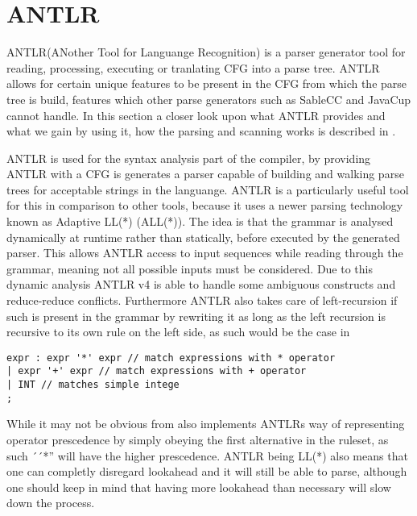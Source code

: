 \section{ANTLR}
ANTLR(ANother Tool for Languange Recognition) is a parser generator tool for reading, processing, executing or tranlating CFG into a parse tree.
ANTLR allows for certain unique features to be present in the CFG from which the parse tree is build, features which other parse generators such as SableCC and JavaCup cannot handle. 
In this section a closer look upon what ANTLR provides and what we gain by using it, how the parsing and scanning works is described in .

ANTLR is used for the syntax analysis part of the compiler, by providing ANTLR with a CFG is generates a parser capable of building and walking parse trees for acceptable strings in the languange.
ANTLR is a particularly useful tool for this in comparison to other tools, because it uses a newer parsing technology known as Adaptive LL(*) (ALL(*)).
The idea is that the grammar is analysed dynamically at runtime rather than statically, before executed by the generated parser.
This allows ANTLR access to input sequences while reading through the grammar, meaning not all possible inputs must be considered.
Due to this dynamic analysis ANTLR v4 is able to handle some ambiguous constructs and reduce-reduce conflicts.
Furthermore ANTLR also takes care of left-recursion if such is present in the grammar by rewriting it as long as the left recursion is recursive to its own rule on the left side, as such would be the case in 
\begin{lstlisting}[caption=An ambiguous rule for expr,frame=tlrb,label={lst:amb}]
expr : expr '*' expr // match expressions with * operator
| expr '+' expr // match expressions with + operator
| INT // matches simple intege
;
\end{lstlisting}
While it may not be obvious from  also implements ANTLRs way of representing operator prescedence by simply obeying the first alternative in the ruleset, as such ´´*'' will have the higher prescedence.
ANTLR being LL(*) also means that one can completly disregard lookahead and it will still be able to parse, although one should keep in mind that having more lookahead than necessary will slow down the process.

